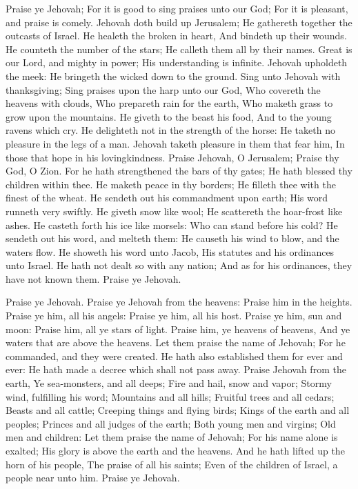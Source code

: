 Praise ye Jehovah; For it is good to sing praises unto our God; For it is pleasant, and praise is comely.  Jehovah doth build up Jerusalem; He gathereth together the outcasts of Israel.  He healeth the broken in heart, And bindeth up their wounds.  He counteth the number of the stars; He calleth them all by their names.  Great is our Lord, and mighty in power; His understanding is infinite.  Jehovah upholdeth the meek: He bringeth the wicked down to the ground.  Sing unto Jehovah with thanksgiving; Sing praises upon the harp unto our God,  Who covereth the heavens with clouds, Who prepareth rain for the earth, Who maketh grass to grow upon the mountains.  He giveth to the beast his food, And to the young ravens which cry.  He delighteth not in the strength of the horse: He taketh no pleasure in the legs of a man.  Jehovah taketh pleasure in them that fear him, In those that hope in his lovingkindness.  Praise Jehovah, O Jerusalem; Praise thy God, O Zion.  For he hath strengthened the bars of thy gates; He hath blessed thy children within thee.  He maketh peace in thy borders; He filleth thee with the finest of the wheat.  He sendeth out his commandment upon earth; His word runneth very swiftly.  He giveth snow like wool; He scattereth the hoar-frost like ashes.  He casteth forth his ice like morsels: Who can stand before his cold?  He sendeth out his word, and melteth them: He causeth his wind to blow, and the waters flow.  He showeth his word unto Jacob, His statutes and his ordinances unto Israel.  He hath not dealt so with any nation; And as for his ordinances, they have not known them. Praise ye Jehovah. 

Praise ye Jehovah. Praise ye Jehovah from the heavens: Praise him in the heights.  Praise ye him, all his angels: Praise ye him, all his host.  Praise ye him, sun and moon: Praise him, all ye stars of light.  Praise him, ye heavens of heavens, And ye waters that are above the heavens.  Let them praise the name of Jehovah; For he commanded, and they were created.  He hath also established them for ever and ever: He hath made a decree which shall not pass away.  Praise Jehovah from the earth, Ye sea-monsters, and all deeps;  Fire and hail, snow and vapor; Stormy wind, fulfilling his word;  Mountains and all hills; Fruitful trees and all cedars;  Beasts and all cattle; Creeping things and flying birds;  Kings of the earth and all peoples; Princes and all judges of the earth;  Both young men and virgins; Old men and children:  Let them praise the name of Jehovah; For his name alone is exalted; His glory is above the earth and the heavens.  And he hath lifted up the horn of his people, The praise of all his saints; Even of the children of Israel, a people near unto him. Praise ye Jehovah. 

